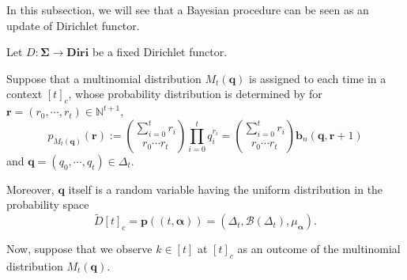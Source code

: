\documentclass[12pt, a4paper]{amsart}
\theoremstyle{plain}
\theoremstyle{definition}
\numberwithin{figure}{section}
\numberwithin{table}{section}
\newcommand{\lspace} {
  \vspace{0.8\baselineskip}
}
\newcommand{\twc}[2]{ %
  [ #1 ]_{ #2 }
}
\newcommand{\textred}[1]{#1}
\newcommand{\textblue}[1]{#1}
\numberwithin{equation}{section}
\newcommand{\bSigma}{\mathbf{\Sigma}}
\begin{document}





In this subsection,
we will see that
a Bayesian procedure can be seen as an update of Dirichlet functor.


Let
$
\textblue{D}
	:
\bSigma \to \mathbf{Diri}
$
be a fixed 
Dirichlet functor.

Suppose that
a \textblue{multinomial distribution}
$
\textred{
M_t
}
(\mathbf{q})
$
is assigned
to each time in a context
$
\textblue{
\twc{t}{c}
}
$,
whose probability distribution is determined by
for
$
\textred{
\mathbf{r}
}
	=
(r_0, \cdots, r_t)
	\in
\mathbb{N}^{t+1}
$,
\[
\textred{
p_{M_t(\mathbf{q})}
}
(\mathbf{r})
	:=
\binom{
	\sum_{i=0}^t r_i
}{
	r_0 \cdots r_t
}
\prod_{i=0}^t
	q_i^{r_i}
	=
\binom{
	\sum_{i=0}^t r_i
}{
	r_0 \cdots r_t
}
\mathbf{b}_n(
	\mathbf{q},
	\mathbf{r} + 1
)
\]
and
$
\textred{
\mathbf{q}
}
	=
(q_0, \cdots, q_t)
	\in
\Delta_t
$.

Moreover,
$
\mathbf{q}
$
itself
is a random variable having the \textblue{uniform distribution} in the probability space
\[
\tilde{D} \twc{t}{c}
	=
\mathbf{p}((t, 
\textred{
	\boldsymbol{\alpha}
}
	))
	=
(
	\Delta_t,
	\mathcal{B}(\Delta_t), 
	\textblue{
	\mu_{\boldsymbol{\alpha}}) .
	}
\] 




\lspace

Now,
suppose that
we observe 
$
\textred{
k
}
	\in
[t]
$
at
$
\twc{t}{c}
$
as 
an \textblue{outcome}
of the multinomial distribution
$
M_t(\mathbf{q})
$.
\end{document}
